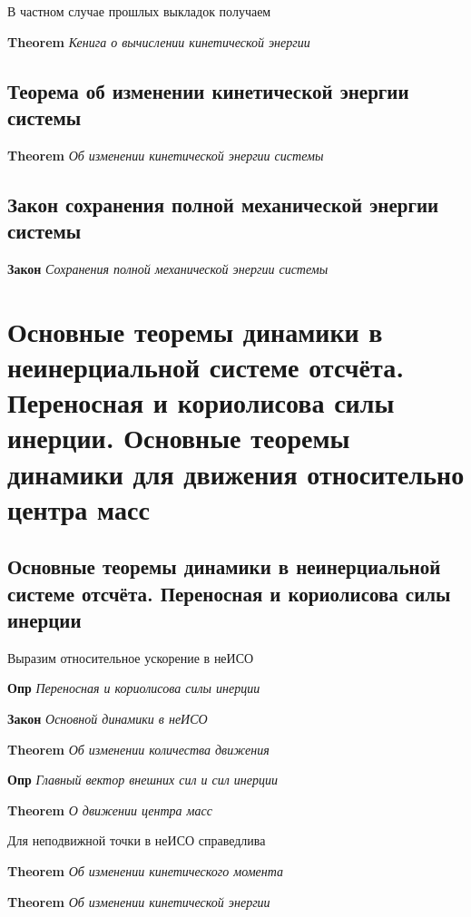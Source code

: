 \documentclass[a4paper, 14pt]{article}
\begin{document}
    В частном случае прошлых выкладок получаем
    
    \textbf{Theorem} \textit{Кенига о вычислении кинетической энергии}
    
    \subsection{Теорема об изменении кинетической энергии системы}
    
    \textbf{Theorem} \textit{Об изменении кинетической энергии системы}
    
    \subsection{Закон сохранения полной механической энергии системы}
    
    \textbf{Закон} \textit{Сохранения полной механической энергии системы}
    
    \section{Основные теоремы динамики в неинерциальной системе отсчёта.
    Переносная и кориолисова силы инерции.
    Основные теоремы динамики для движения относительно центра масс}
    
    \subsection{Основные теоремы динамики в неинерциальной системе отсчёта. Переносная и кориолисова силы инерции}
    
    Выразим относительное ускорение в неИСО
    
    \textbf{Опр} \textit{Переносная и кориолисова силы инерции}
    
    \textbf{Закон} \textit{Основной динамики в неИСО}
    
    \textbf{Theorem} \textit{Об изменении количества движения}
    
    \textbf{Опр} \textit{Главный вектор внешних сил и сил инерции}
    
    \textbf{Theorem} \textit{О движении центра масс}
    
    Для неподвижной точки в неИСО справедлива
    
    \textbf{Theorem} \textit{Об изменении кинетического момента}
    
    \textbf{Theorem} \textit{Об изменении кинетической энергии}
    
\end{document}

